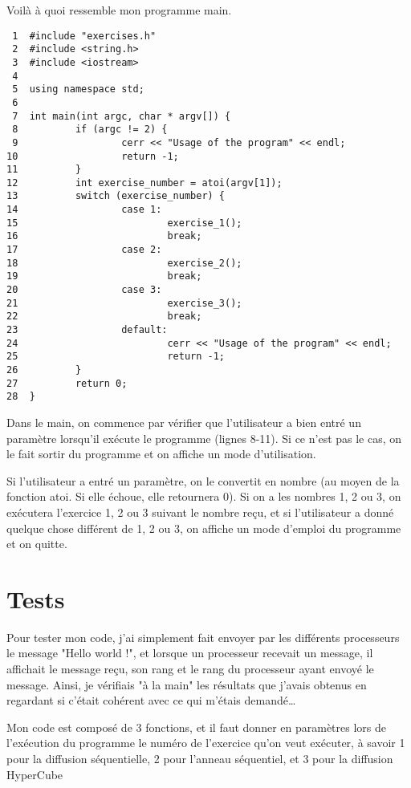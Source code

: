 \documentclass[11pt]{article}
\begin{document}
Voilà à quoi ressemble mon programme main.
\begin{verbatim}
 1  #include "exercises.h"
 2  #include <string.h>
 3  #include <iostream>
 4  
 5  using namespace std;
 6  
 7  int main(int argc, char * argv[]) {
 8          if (argc != 2) {
 9                  cerr << "Usage of the program" << endl;
10                  return -1;
11          }
12          int exercise_number = atoi(argv[1]);
13          switch (exercise_number) {
14                  case 1:
15                          exercise_1();
16                          break;
17                  case 2:
18                          exercise_2();
19                          break;
20                  case 3:
21                          exercise_3();
22                          break;
23                  default:
24                          cerr << "Usage of the program" << endl;
25                          return -1;
26          }
27          return 0;
28  }
\end{verbatim}

Dans le main, on commence par vérifier que l'utilisateur a bien entré un paramètre lorsqu'il exécute le programme (lignes 8-11). Si ce n'est pas le cas, on le fait sortir du programme et on affiche un
mode d'utilisation.

Si l'utilisateur a entré un paramètre, on le convertit en nombre (au moyen de la fonction atoi. Si elle échoue, elle retournera 0). Si on a les nombres 1, 2 ou 3, on exécutera l'exercice 1, 2 ou 3 suivant le nombre reçu,
et si l'utilisateur a donné quelque chose différent de 1, 2 ou 3, on affiche un mode d'emploi du programme et on quitte.


\section{Tests}
\label{sec:org1923ab3}

Pour tester mon code, j'ai simplement fait envoyer par les différents processeurs le message "Hello world !", et lorsque un processeur recevait un message, il affichait le message reçu,
son rang et le rang du processeur ayant envoyé le message. Ainsi, je vérifiais "à la main" les résultats que j'avais obtenus en regardant si c'était cohérent avec ce qui m'étais demandé\ldots{}

Mon code est composé de 3 fonctions, et il faut donner en paramètres lors de l'exécution du programme le numéro de l'exercice qu'on veut exécuter,
à savoir 1 pour la diffusion séquentielle, 2 pour l'anneau séquentiel, et 3 pour la diffusion HyperCube
\end{document}

